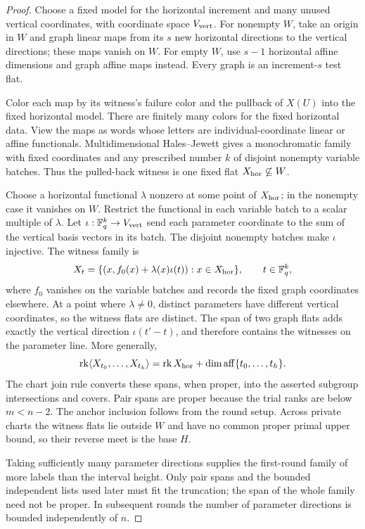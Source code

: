 \begin{proof}
Choose a fixed model for the horizontal increment and many unused
vertical coordinates, with coordinate space $V_{\rm vert}$.
For nonempty $W$, take an origin in $W$ and graph
linear maps from its $s$ new horizontal directions to the vertical
directions; these maps vanish on $W$. For empty $W$, use $s-1$ horizontal
affine dimensions and graph affine maps instead. Every graph is an
increment-$s$ test flat.

Color each map by its witness's failure color and the pullback of $X(U)$
into the fixed horizontal model. There are finitely many colors for the
fixed horizontal data. View the maps as words whose letters are
individual-coordinate linear or affine functionals. Multidimensional
Hales--Jewett \citep{HalesJewett1963} gives a monochromatic family with
fixed coordinates and any prescribed number $k$ of disjoint nonempty
variable batches. Thus the pulled-back witness is one fixed flat
$X_{\rm hor}\not\subseteq W$.

Choose a horizontal functional $\lambda$ nonzero at some point of $X_{\rm hor}$;
in the nonempty case it vanishes on $W$. Restrict the functional in each
variable batch to a scalar multiple of $\lambda$. Let
$\iota:\mathbb F_q^k\to V_{\rm vert}$ send each parameter coordinate
to the sum of the vertical basis vectors in its batch. The disjoint
nonempty batches make $\iota$ injective. The witness family is
\begin{equation}\label{c:graph-witnesses}
 X_t=\{(x,f_0(x)+\lambda(x)\iota(t)):x\in X_{\rm hor}\},
 \qquad t\in\mathbb F_q^k,
\end{equation}
where $f_0$ vanishes on the variable batches and records the fixed graph
coordinates elsewhere. At a point where $\lambda\ne0$, distinct parameters
have different vertical coordinates, so the witness flats are distinct.
The span of two graph flats adds exactly the vertical direction
$\iota(t'-t)$, and therefore contains the witnesses on the parameter
line. More generally,
\begin{equation}\label{c:graph-span-rank}
 \operatorname{rk}\langle X_{t_0},\ldots,X_{t_h}\rangle
 =\operatorname{rk}X_{\rm hor}+
   \dim\operatorname{aff}\{t_0,\ldots,t_h\}.
\end{equation}
The chart join rule converts these spans, when proper, into the asserted
subgroup intersections and covers. Pair spans are proper because the
trial ranks are below $m<n-2$. The anchor inclusion follows from the
round setup. Across private charts the witness flats lie outside $W$
and have no common proper primal upper bound, so their reverse meet is
the base $H$.

Taking sufficiently many parameter directions supplies the first-round
family of more labels than the interval height. Only pair spans and the
bounded independent lists used later must fit the truncation; the span
of the whole family need not be proper. In subsequent rounds the number
of parameter directions is bounded independently of $n$.
\end{proof}

